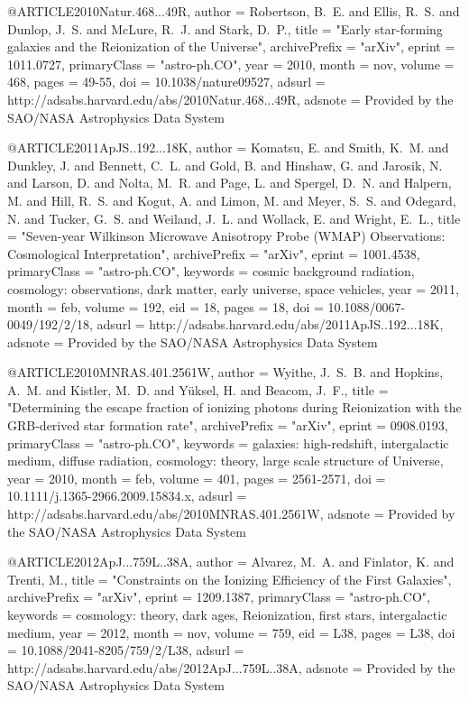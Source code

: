 \documentclass{article}
\begin{document}
@ARTICLE{2010Natur.468...49R,
   author = {{Robertson}, B.~E. and {Ellis}, R.~S. and {Dunlop}, J.~S. and 
	{McLure}, R.~J. and {Stark}, D.~P.},
    title = "{Early star-forming galaxies and the Reionization of the Universe}",
archivePrefix = "arXiv",
   eprint = {1011.0727},
 primaryClass = "astro-ph.CO",
     year = 2010,
    month = nov,
   volume = 468,
    pages = {49-55},
      doi = {10.1038/nature09527},
   adsurl = {http://adsabs.harvard.edu/abs/2010Natur.468...49R},
  adsnote = {Provided by the SAO/NASA Astrophysics Data System}
}

@ARTICLE{2011ApJS..192...18K,
   author = {{Komatsu}, E. and {Smith}, K.~M. and {Dunkley}, J. and {Bennett}, C.~L. and 
	{Gold}, B. and {Hinshaw}, G. and {Jarosik}, N. and {Larson}, D. and 
	{Nolta}, M.~R. and {Page}, L. and {Spergel}, D.~N. and {Halpern}, M. and 
	{Hill}, R.~S. and {Kogut}, A. and {Limon}, M. and {Meyer}, S.~S. and 
	{Odegard}, N. and {Tucker}, G.~S. and {Weiland}, J.~L. and {Wollack}, E. and 
	{Wright}, E.~L.},
    title = "{Seven-year Wilkinson Microwave Anisotropy Probe (WMAP) Observations: Cosmological Interpretation}",
archivePrefix = "arXiv",
   eprint = {1001.4538},
 primaryClass = "astro-ph.CO",
 keywords = {cosmic background radiation, cosmology: observations, dark matter, early universe, space vehicles},
     year = 2011,
    month = feb,
   volume = 192,
      eid = {18},
    pages = {18},
      doi = {10.1088/0067-0049/192/2/18},
   adsurl = {http://adsabs.harvard.edu/abs/2011ApJS..192...18K},
  adsnote = {Provided by the SAO/NASA Astrophysics Data System}
}

@ARTICLE{2010MNRAS.401.2561W,
   author = {{Wyithe}, J.~S.~B. and {Hopkins}, A.~M. and {Kistler}, M.~D. and 
	{Y{\"u}ksel}, H. and {Beacom}, J.~F.},
    title = "{Determining the escape fraction of ionizing photons during Reionization with the GRB-derived star formation rate}",
archivePrefix = "arXiv",
   eprint = {0908.0193},
 primaryClass = "astro-ph.CO",
 keywords = {galaxies: high-redshift, intergalactic medium, diffuse radiation, cosmology: theory, large scale structure of Universe},
     year = 2010,
    month = feb,
   volume = 401,
    pages = {2561-2571},
      doi = {10.1111/j.1365-2966.2009.15834.x},
   adsurl = {http://adsabs.harvard.edu/abs/2010MNRAS.401.2561W},
  adsnote = {Provided by the SAO/NASA Astrophysics Data System}
}
	
@ARTICLE{2012ApJ...759L..38A,
   author = {{Alvarez}, M.~A. and {Finlator}, K. and {Trenti}, M.},
    title = "{Constraints on the Ionizing Efficiency of the First Galaxies}",
archivePrefix = "arXiv",
   eprint = {1209.1387},
 primaryClass = "astro-ph.CO",
 keywords = {cosmology: theory, dark ages, Reionization, first stars, intergalactic medium},
     year = 2012,
    month = nov,
   volume = 759,
      eid = {L38},
    pages = {L38},
      doi = {10.1088/2041-8205/759/2/L38},
   adsurl = {http://adsabs.harvard.edu/abs/2012ApJ...759L..38A},
  adsnote = {Provided by the SAO/NASA Astrophysics Data System}
}  
\end{document}
